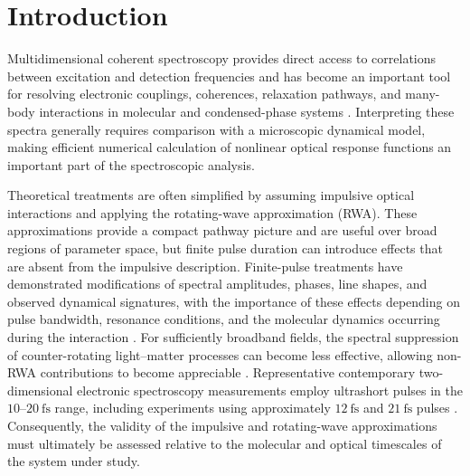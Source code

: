 \section{Introduction}
\label{sec:introduction}

Multidimensional coherent spectroscopy provides direct access to
correlations between excitation and detection frequencies and has
become an important tool for resolving electronic couplings,
coherences, relaxation pathways, and many-body interactions in
molecular and condensed-phase systems
\cite{
Abramavicius2009CoherentMultidimensional,
Oliver2018MultidimensionalReview,
Hybl1998TwoDimensional}.
Interpreting these spectra generally requires comparison with a
microscopic dynamical model, making efficient numerical calculation of
nonlinear optical response functions an important part of the
spectroscopic analysis.

Theoretical treatments are often simplified by assuming impulsive
optical interactions and applying the rotating-wave approximation
(RWA).
These approximations provide a compact pathway picture and are useful
over broad regions of parameter space, but finite pulse duration can
introduce effects that are absent from the impulsive description.
Finite-pulse treatments have demonstrated modifications of spectral
amplitudes, phases, line shapes, and observed dynamical signatures,
with the importance of these effects depending on pulse bandwidth,
resonance conditions, and the molecular dynamics occurring during the
interaction
\cite{
Smallwood2017FinitePulse,
Perlik2017FinitePulse,
DoGelinTan2017FinitePulse,
Leng2017FinitePulseWidth}.
For sufficiently broadband fields, the spectral suppression of
counter-rotating light--matter processes can become less effective,
allowing non-RWA contributions to become appreciable
\cite{Smallwood2017FinitePulse,Tan2026RWA}.
Representative contemporary two-dimensional electronic spectroscopy
measurements employ ultrashort pulses in the $10$--$20~\mathrm{fs}$
range, including experiments using approximately $12~\mathrm{fs}$ and
$21~\mathrm{fs}$ pulses
\cite{Timmer2023Plasmon,RojasGatjens2023ManyExciton}.
Consequently, the validity of the impulsive and rotating-wave
approximations must ultimately be assessed relative to the molecular and
optical timescales of the system under study.

